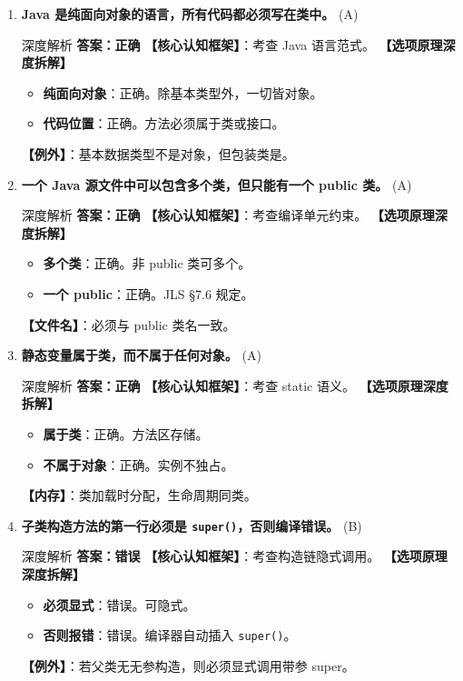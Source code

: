 \documentclass[12pt, a4paper]{ctexart}
\newcommand{\code}[1]{\texttt{#1}}
\newcommand{\tfblank}{\underline{\hspace{1.5em}}}
\begin{document}
\begin{enumerate}[label=\textbf{\arabic*.}, itemsep=1em]
    \item \textbf{Java 是纯面向对象的语言，所有代码都必须写在类中。} \tfblank (A)
    \begin{bluebox}{深度解析}
    \textbf{答案：正确}
    \textbf{【核心认知框架】}：考查 Java 语言范式。
    \textbf{【选项原理深度拆解】}
    \begin{itemize}[leftmargin=*, nosep]
        \item \textbf{纯面向对象}：正确。除基本类型外，一切皆对象。
        \item \textbf{代码位置}：正确。方法必须属于类或接口。
    \end{itemize}
    \textbf{【例外】}：基本数据类型不是对象，但包装类是。
    \end{bluebox}

    \item \textbf{一个 Java 源文件中可以包含多个类，但只能有一个 public 类。} \tfblank (A)
    \begin{bluebox}{深度解析}
    \textbf{答案：正确}
    \textbf{【核心认知框架】}：考查编译单元约束。
    \textbf{【选项原理深度拆解】}
    \begin{itemize}[leftmargin=*, nosep]
        \item \textbf{多个类}：正确。非 public 类可多个。
        \item \textbf{一个 public}：正确。JLS §7.6 规定。
    \end{itemize}
    \textbf{【文件名】}：必须与 public 类名一致。
    \end{bluebox}

    \item \textbf{静态变量属于类，而不属于任何对象。} \tfblank (A)
    \begin{bluebox}{深度解析}
    \textbf{答案：正确}
    \textbf{【核心认知框架】}：考查 static 语义。
    \textbf{【选项原理深度拆解】}
    \begin{itemize}[leftmargin=*, nosep]
        \item \textbf{属于类}：正确。方法区存储。
        \item \textbf{不属于对象}：正确。实例不独占。
    \end{itemize}
    \textbf{【内存】}：类加载时分配，生命周期同类。
    \end{bluebox}

    \item \textbf{子类构造方法的第一行必须是 \code{super()}，否则编译错误。} \tfblank (B)
    \begin{bluebox}{深度解析}
    \textbf{答案：错误}
    \textbf{【核心认知框架】}：考查构造链隐式调用。
    \textbf{【选项原理深度拆解】}
    \begin{itemize}[leftmargin=*, nosep]
        \item \textbf{必须显式}：错误。可隐式。
        \item \textbf{否则报错}：错误。编译器自动插入 \code{super()}。
    \end{itemize}
    \textbf{【例外】}：若父类无无参构造，则必须显式调用带参 super。
    \end{bluebox}


\end{enumerate}
\end{document}
